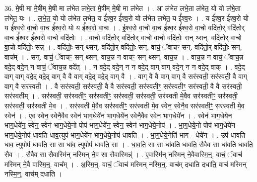 \documentclass[17pt]{extarticle}
\begin{document}
36. मे॒षी मा मे॒षीम् मे॒षी मा ल॑भेत लभे॒ता मे॒षीम् मे॒षी मा ल॑भेत । . आ ल॑भेत लभे॒ता ल॑भेत॒ यो यो ल॑भे॒ता ल॑भेत॒ यः । . ल॒भे॒त॒ यो यो ल॑भेत लभेत॒ य ई᳚श्व॒र ई᳚श्व॒रो यो ल॑भेत लभेत॒ य ई᳚श्व॒रः । . य ई᳚श्व॒र ई᳚श्व॒रो यो य ई᳚श्व॒रो वा॒चो वा॒च ई᳚श्व॒रो यो य ई᳚श्व॒रो वा॒चः । . ई॒श्व॒रो वा॒चो वा॒च ई᳚श्व॒र ई᳚श्व॒रो वा॒चो वदि॑तो॒र् वदि॑तोर् वा॒च ई᳚श्व॒र ई᳚श्व॒रो वा॒चो वदि॑तोः । . वा॒चो वदि॑तो॒र् वदि॑तोर् वा॒चो वा॒चो वदि॑तोः॒ सन् थ्सन्. वदि॑तोर् वा॒चो वा॒चो वदि॑तोः॒ सन्न् । . वदि॑तोः॒ सन् थ्सन्. वदि॑तो॒र् वदि॑तोः॒ सन्. वाचं॒ ॅवाचꣳ॒॒ सन्. वदि॑तो॒र् वदि॑तोः॒ सन्. वाच᳚म् । . सन्. वाचं॒ ॅवाचꣳ॒॒ सन् थ्सन्. वाच॒न्न न वाचꣳ॒॒ सन् थ्सन्. वाच॒न्न । . वाच॒न्न न वाचं॒ ॅवाच॒न्न वदे॒द् वदे॒न् न वाचं॒ ॅवाच॒न्न वदे᳚त् । . न वदे॒द् वदे॒न् न न वदे॒द् वाग् वाग् वदे॒न् न न वदे॒द् वाक् । . वदे॒द् वाग् वाग् वदे॒द् वदे॒द् वाग् वै वै वाग् वदे॒द् वदे॒द् वाग् वै । . वाग् वै वै वाग् वाग् वै सर॑स्वती॒ सर॑स्वती॒ वै वाग् वाग् वै सर॑स्वती । . वै सर॑स्वती॒ सर॑स्वती॒ वै वै सर॑स्वती॒ सर॑स्वतीꣳ॒॒ सर॑स्वतीꣳ॒॒ सर॑स्वती॒ वै वै सर॑स्वती॒ सर॑स्वतीम् । . सर॑स्वती॒ सर॑स्वतीꣳ॒॒ सर॑स्वतीꣳ॒॒ सर॑स्वती॒ सर॑स्वती॒ सर॑स्वती मे॒वैव सर॑स्वतीꣳ॒॒ सर॑स्वती॒ सर॑स्वती॒ सर॑स्वती मे॒व । . सर॑स्वती मे॒वैव सर॑स्वतीꣳ॒॒ सर॑स्वती मे॒व स्वेन॒ स्वेनै॒व सर॑स्वतीꣳ॒॒ सर॑स्वती मे॒व स्वेन॑ । . ए॒व स्वेन॒ स्वेनै॒वैव स्वेन॑ भाग॒धेये॑न भाग॒धेये॑न॒ स्वेनै॒वैव स्वेन॑ भाग॒धेये॑न । . स्वेन॑ भाग॒धेये॑न भाग॒धेये॑न॒ स्वेन॒ स्वेन॑ भाग॒धेये॒नो पोप॑ भाग॒धेये॑न॒ स्वेन॒ स्वेन॑ भाग॒धेये॒नोप॑ । . भा॒ग॒धेये॒नो पोप॑ भाग॒धेये॑न भाग॒धेये॒नोप॑ धावति धाव॒त्युप॑ भाग॒धेये॑न भाग॒धेये॒नोप॑ धावति । . भा॒ग॒धेये॒नेति॑ भाग - धेये॑न । . उप॑ धावति धाव॒ त्युपोप॑ धावति॒ सा सा धा॑व॒ त्युपोप॑ धावति॒ सा । . धा॒व॒ति॒ सा सा धा॑वति धावति॒ सैवैव सा धा॑वति धावति॒ सैव । . सैवैव सा सैवास्मि॑न् नस्मिन् ने॒व सा सैवास्मिन्न्॑ । . ए॒वास्मि॑न् नस्मिन् ने॒वैवास्मि॒न्॒. वाचं॒ ॅवाच॑ मस्मिन् ने॒वै वास्मि॒न्॒. वाच᳚म् । . अ॒स्मि॒न्॒. वाचं॒ ॅवाच॑ मस्मिन् नस्मि॒न्॒. वाच॑म् दधाति दधाति॒ वाच॑ मस्मिन् नस्मि॒न्॒. वाच॑म् दधाति । \newline
\pagebreak
{}
\end{document}
